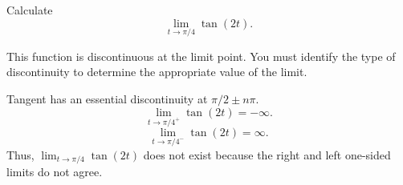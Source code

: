 \documentclass{ximera}
\author{Emma Smith Zbarsky}
\begin{document}
\begin{exercise}

Calculate \[\lim_{t \to \pi/4} \tan(2t).\]


\begin{hint}
This function is discontinuous at the limit point. You must identify the
type of discontinuity to determine the appropriate value of the limit.
\end{hint}


\begin{hint}
Tangent has an essential discontinuity at
$\displaystyle \pi/2 \pm n\pi$.
\[\lim_{t\to \pi/4^+} \tan(2t) = -\infty.\]
\[\lim_{t\to \pi/4^-} \tan(2t) = \infty.\] Thus,
$\displaystyle \lim_{t\to \pi/4} \tan(2t)$ does not exist because the
right and left one-sided limits do not agree.
\end{hint}


\begin{multipleChoice}
\choice{$\infty$}
\end{multipleChoice}

\end{exercise}
\end{document}
